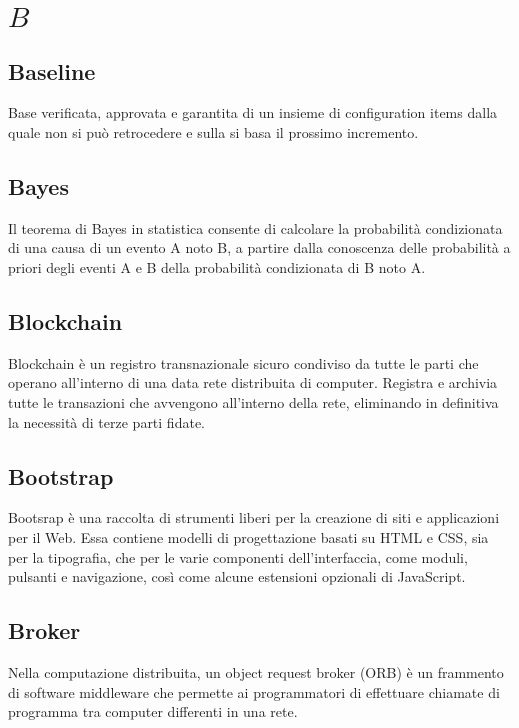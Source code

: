 \section{\quad$B\quad$}
\subsection{Baseline}
Base verificata, approvata e garantita di un insieme di configuration items dalla quale non si può retrocedere e sulla si basa il prossimo incremento.

\subsection{Bayes}
Il teorema di Bayes in statistica consente di calcolare la probabilità condizionata di una causa di un evento A noto B, 
a partire dalla conoscenza delle probabilità a priori degli eventi A e B della probabilità condizionata di B noto A.

\subsection{Blockchain}
Blockchain è un registro transnazionale sicuro condiviso da tutte le parti che operano all’interno di una data rete distribuita di computer. Registra e archivia tutte le transazioni che avvengono all’interno della rete, eliminando in definitiva la necessità di terze parti fidate.

\subsection{Bootstrap}
Bootsrap è una raccolta di strumenti liberi per la creazione di siti e applicazioni per il Web. 
Essa contiene modelli di progettazione basati su HTML e CSS, sia per la tipografia, che per le varie componenti dell'interfaccia, come moduli, 
pulsanti e navigazione, così come alcune estensioni opzionali di JavaScript.

\subsection{Broker}
Nella computazione distribuita, un object request broker (ORB) è un frammento di software middleware che permette ai programmatori di effettuare chiamate di programma tra computer differenti in una rete.

